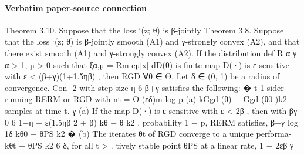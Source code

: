 \documentclass[10pt]{article}
\begin{document}
\paragraph{Verbatim paper-source connection}
\begin{ReviewVerbatim}
Theorem 3.10. Suppose that the loss `(z; θ) is β-jointly
Theorem 3.8. Suppose that the loss `(z; θ) is β-jointly                       smooth (A1) and γ-strongly convex (A2), and that there exist
smooth (A1) and γ-strongly convex (A2). If the distribution                                                def R        α
                                        γ                                     α > 1, µ > 0 such that ξα,µ = Rm eµ|x| dD(θ) is ﬁnite
map D(·) is ε-sensitive with ε < (β+γ)(1+1.5ηβ) , then RGD
                                                                              ∀θ ∈ Θ. Let δ ∈ (0, 1) be a radius of convergence.     Con-
                     2
with step size η 6 β+γ satisﬁes the following:
                                                                                                                                    � t
                                                                                                                            1
                                                                              sider running RERM or RGD with nt = O (εδ)m log p
(a) kGgd (θ) − Ggd (θ0 )k2                                                    samples at time t.
                                                                                                                            γ
                                                                              (a) If the map D(·) is ε-sensitive with ε < 2β  , then with
                         βγ                                          0
      6       1−η           − ε(1.5ηβ 2 + β)             kθ − θ k2 .              probability 1 − p, RERM satisﬁes,
                        β+γ
                                                                                                                  log 1δ kθ0 − θPS k2
                                                                                                                     �
(b) The iterates θt of RGD converge to a unique performa-                           kθt − θPS k2 6 δ, for all t >                       .
    tively stable point θPS at a linear rate,                                                                           1 − 2εβ
                                                                                                                              γ


\end{ReviewVerbatim}
\end{document}
